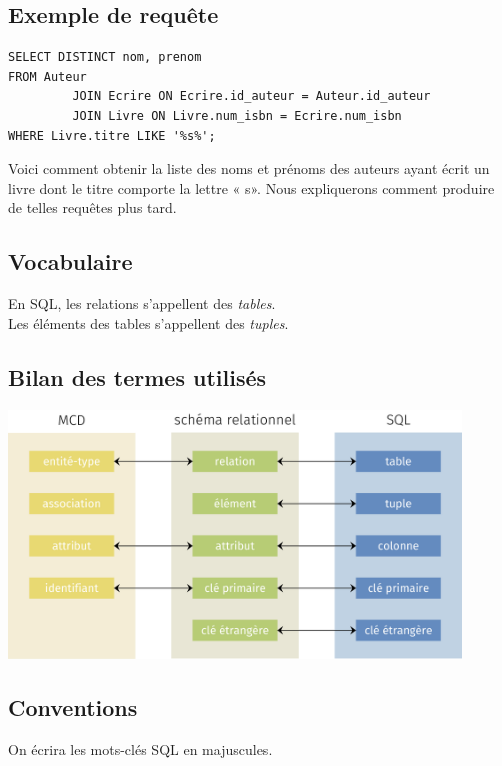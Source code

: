 \documentclass[10pt,cours,a4paper,firamath]{nsi}
\begin{document}
\subsection{Exemple de requête}

\footnotesize

\begin{sql}
    \begin{verbatim}
SELECT DISTINCT nom, prenom
FROM Auteur
         JOIN Ecrire ON Ecrire.id_auteur = Auteur.id_auteur
         JOIN Livre ON Livre.num_isbn = Ecrire.num_isbn
WHERE Livre.titre LIKE '%s%';
\end{verbatim}
\end{sql}

\normalsize
Voici comment obtenir la liste des noms et prénoms des auteurs ayant écrit un livre dont le titre comporte la lettre « s». Nous expliquerons comment produire de telles requêtes plus tard.

\subsection{Vocabulaire}
En SQL, les relations s'appellent des \textit{tables}.\\

Les éléments des tables s'appellent des \textit{tuples}.

\subsection{Bilan des termes utilisés}
\begin{center}
    \includegraphics[width=12cm]{img/classification}
\end{center}

\subsection{Conventions}
On écrira les mots-clés SQL en majuscules.\\
\end{document}
